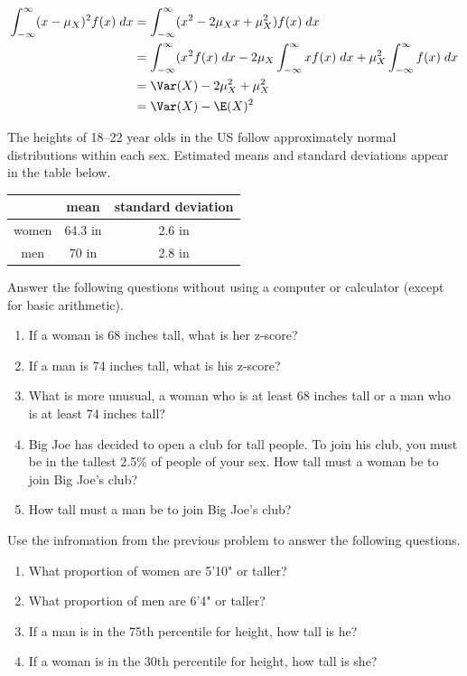 \documentclass[twoside]{book}\usepackage[]{graphicx}\usepackage[]{xcolor}
\begin{document}
\begin{solution}
	\begin{align*}
	\int_{-\infty}^{\infty} (x - \mu_X) ^2 f(x) \; dx
	&=
	\int_{-\infty}^{\infty} (x^2 - 2\mu_X x + \mu_X^2) f(x) \; dx
	\\
	&=
	\int_{-\infty}^{\infty} (x^2 f(x) \; dx
	- 2 \mu_X \int_{-\infty}^{\infty} x f(x) \; dx
	+ \mu_X^2 \int_{-\infty}^{\infty} f(x) \; dx
	\\
	&=
	\Var(X) - 2 \mu_X^2 + \mu_X^2
	\\
	&=
	\Var(X) - \E(X)^2 
\end{align*}
\end{solution}

\begin{problem}
	The heights of 18--22 year olds in the US follow approximately normal distributions
	within each sex.  Estimated means and standard deviations appear in the table below.
	\begin{center}
		\begin{tabular}{ccc}
			\hline
			& mean & standard deviation \\
			\hline
			women &64.3 in & 2.6 in  
			\\
			men & 70 in & 2.8 in
			\\
			\hline
		\end{tabular}
	\end{center}
	Answer the following questions without using a computer or calculator (except for basic
	arithmetic).
	\begin{enumerate}
		\item If a woman is 68 inches tall, what is her z-score?
		\item If a man is 74 inches tall, what is his z-score?
		\item What is more unusual, a woman who is at least 68 inches tall
			or a man who is at least 74 inches tall?
		\item
			Big Joe has decided to open a club for tall people.  To join his club,
			you must be in the tallest 2.5\% of people of your sex.
			How tall must a woman be to join Big Joe's club?
		\item
			How tall must a man be to join Big Joe's club?
	\end{enumerate}
\end{problem}

\begin{problem}
	Use the infromation from the previous problem to answer the following questions.
	\begin{enumerate}
		\item
			What proportion of women are 5'10" or taller?
		\item
			What proportion of men are 6'4" or taller?
		\item
			If a man is in the 75th percentile for height, how tall is he?
		\item
			If a woman is in the 30th percentile for height, how tall is she?
	\end{enumerate}
\end{problem}
\end{document}
